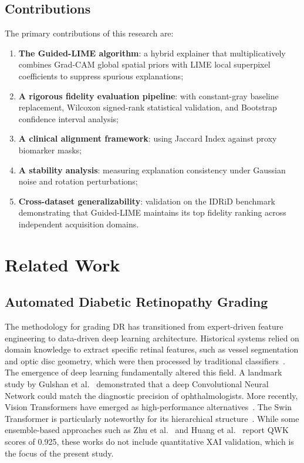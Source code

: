 \documentclass[10pt,twoside]{article}
\begin{document}
\subsection*{Contributions}

The primary contributions of this research are:
\begin{enumerate}
\item \textbf{The Guided-LIME algorithm}: a hybrid explainer that multiplicatively combines Grad-CAM global spatial priors with LIME local superpixel coefficients to suppress spurious explanations;
\item \textbf{A rigorous fidelity evaluation pipeline}: with constant-gray baseline replacement, Wilcoxon signed-rank statistical validation, and Bootstrap confidence interval analysis;
\item \textbf{A clinical alignment framework}: using Jaccard Index against proxy biomarker masks;
\item \textbf{A stability analysis}: measuring explanation consistency under Gaussian noise and rotation perturbations;
\item \textbf{Cross-dataset generalizability}: validation on the IDRiD benchmark demonstrating that Guided-LIME maintains its top fidelity ranking across independent acquisition domains.
\end{enumerate}

\section{Related Work}
\label{sec:related}

\subsection{Automated Diabetic Retinopathy Grading}

The methodology for grading DR has transitioned from expert-driven feature engineering to data-driven deep learning architecture. Historical systems relied on domain knowledge to extract specific retinal features, such as vessel segmentation and optic disc geometry, which were then processed by traditional classifiers~\cite{saranya2020automatic}. The emergence of deep learning fundamentally altered this field. A landmark study by Gulshan et al.~\cite{gulshan2016development} demonstrated that a deep Convolutional Neural Network could match the diagnostic precision of ophthalmologists. More recently, Vision Transformers have emerged as high-performance alternatives~\cite{tan2019efficientnet}. The Swin Transformer is particularly noteworthy for its hierarchical structure~\cite{liu2021swin}. While some ensemble-based approaches such as Zhu et al.~\cite{zhu2024nnmobilenet} and Huang et al.~\cite{huang2024ssit} report QWK scores of 0.925, these works do not include quantitative XAI validation, which is the focus of the present study.
\end{document}
